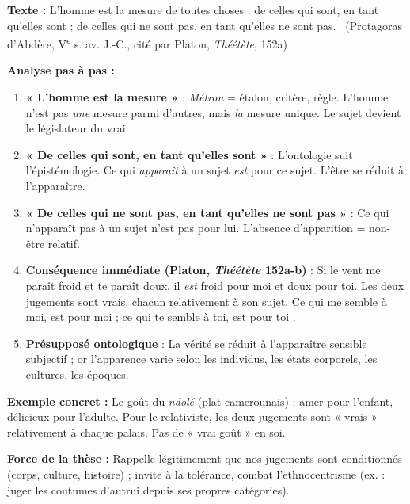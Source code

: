 \documentclass[11pt]{article}
\begin{document}
\begin{experience}
\textbf{Texte :} \guillemotleft L'homme est la mesure de toutes choses : de celles qui sont, en tant qu'elles sont ; de celles qui ne sont pas, en tant qu'elles ne sont pas. \guillemotright\ (Protagoras d'Abdère, V\textsuperscript{e} s. av. J.-C., cité par Platon, \emph{Théétète}, 152a)

\textbf{Analyse pas à pas :}
\begin{enumerate}
\item \textbf{« L'homme est la mesure »} : \emph{Métron} = étalon, critère, règle. L'homme n'est pas \emph{une} mesure parmi d'autres, mais \emph{la} mesure unique. Le sujet devient le législateur du vrai.
\item \textbf{« De celles qui sont, en tant qu'elles sont »} : L'ontologie suit l'épistémologie. Ce qui \emph{apparaît} à un sujet \emph{est} pour ce sujet. L'être se réduit à l'apparaître.
\item \textbf{« De celles qui ne sont pas, en tant qu'elles ne sont pas »} : Ce qui n'apparaît pas à un sujet n'est pas pour lui. L'absence d'apparition = non-être relatif.
\item \textbf{Conséquence immédiate (Platon, \emph{Théétète} 152a-b)} : Si le vent me paraît froid et te paraît doux, il \emph{est} froid pour moi et doux pour toi. Les deux jugements sont vrais, chacun relativement à son sujet. \guillemotleft Ce qui me semble à moi, est pour moi ; ce qui te semble à toi, est pour toi \guillemotright.
\item \textbf{Présupposé ontologique} : La vérité se réduit à l'apparaître sensible subjectif ; or l'apparence varie selon les individus, les états corporels, les cultures, les époques.
\end{enumerate}

\textbf{Exemple concret :} Le goût du \emph{ndolé} (plat camerounais) : amer pour l'enfant, délicieux pour l'adulte. Pour le relativiste, les deux jugements sont « vrais » relativement à chaque palais. Pas de « vrai goût » en soi.

\textbf{Force de la thèse :} Rappelle légitimement que nos jugements sont conditionnés (corps, culture, histoire) ; invite à la tolérance, combat l'ethnocentrisme (ex. : juger les coutumes d'autrui depuis ses propres catégories).


\end{experience}
\end{document}
